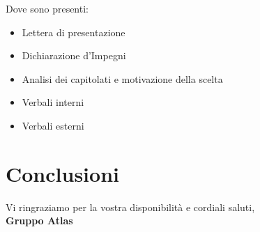 \documentclass[a4paper,12pt]{article}
\begin{document}
Dove sono presenti:
\begin{itemize}
    \item Lettera di presentazione
    \item Dichiarazione d'Impegni
    \item Analisi dei capitolati e motivazione della scelta
    \item Verbali interni
    \item Verbali esterni
\end{itemize}

\section*{Conclusioni}
Vi ringraziamo per la vostra disponibilità e cordiali saluti, \\
\textbf{Gruppo Atlas}
\end{document}
